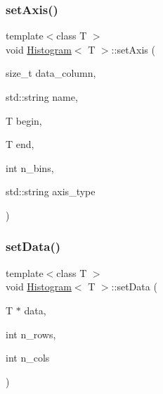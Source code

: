 \mbox{\label{class_histogram_abb5b7f6edba2b9a99b6c456c23383d87}} 
\subsubsection{\texorpdfstring{set\+Axis()}{setAxis()}\hspace{0.1cm}{\footnotesize\ttfamily [2/2]}}
{\footnotesize\ttfamily template$<$class T $>$ \\
void \hyperlink{class_histogram}{Histogram}$<$ T $>$\+::set\+Axis (\begin{DoxyParamCaption}\item[{size\+\_\+t}]{data\+\_\+column,  }\item[{std\+::string}]{name,  }\item[{T}]{begin,  }\item[{T}]{end,  }\item[{int}]{n\+\_\+bins,  }\item[{std\+::string}]{axis\+\_\+type }\end{DoxyParamCaption})\hspace{0.3cm}{\ttfamily [inline]}}

\mbox{\label{class_histogram_a991af624b61ad77f0ecab2697565884b}} 
\subsubsection{\texorpdfstring{set\+Data()}{setData()}}
{\footnotesize\ttfamily template$<$class T $>$ \\
void \hyperlink{class_histogram}{Histogram}$<$ T $>$\+::set\+Data (\begin{DoxyParamCaption}\item[{T $\ast$}]{data,  }\item[{int}]{n\+\_\+rows,  }\item[{int}]{n\+\_\+cols }\end{DoxyParamCaption})\hspace{0.3cm}{\ttfamily [inline]}}

\mbox{\label{class_histogram_a383443d35829da535f3c049b002928ca}} 
